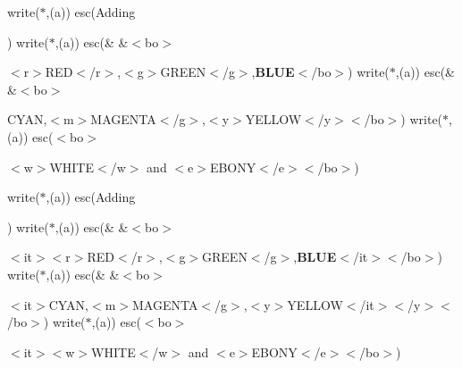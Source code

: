 write($\ast$,\textquotesingle{}(a)\textquotesingle{}) esc(\textquotesingle{}Adding 
\begin{DoxyItemize}
\item 
\end{DoxyItemize}\textquotesingle{}) write($\ast$,\textquotesingle{}(a)\textquotesingle{}) esc(\& \&\textquotesingle{}$<$bo$>$
\begin{DoxyItemize}
\item 
\end{DoxyItemize}$<$r$>$R\+ED$<$/r$>$,$<$g$>$G\+R\+E\+EN$<$/g$>$,{\bfseries B\+L\+UE}$<$/bo$>$\textquotesingle{}) write($\ast$,\textquotesingle{}(a)\textquotesingle{}) esc(\& \&\textquotesingle{}$<$bo$>$
\begin{DoxyItemize}
\item 
\end{DoxyItemize}{\ttfamily C\+Y\+AN},$<$m$>$M\+A\+G\+E\+N\+TA$<$/g$>$,$<$y$>$Y\+E\+L\+L\+OW$<$/y$>$$<$/bo$>$\textquotesingle{}) write($\ast$,\textquotesingle{}(a)\textquotesingle{}) esc(\textquotesingle{}$<$bo$>$
\begin{DoxyItemize}
\item 
\end{DoxyItemize}$<$w$>$W\+H\+I\+TE$<$/w$>$ and $<$e$>$E\+B\+O\+NY$<$/e$>$$<$/bo$>$\textquotesingle{})

write($\ast$,\textquotesingle{}(a)\textquotesingle{}) esc(\textquotesingle{}Adding 
\begin{DoxyItemize}
\item 
\end{DoxyItemize}\textquotesingle{}) write($\ast$,\textquotesingle{}(a)\textquotesingle{}) esc(\& \&\textquotesingle{}$<$bo$>$
\begin{DoxyItemize}
\item 
\end{DoxyItemize}$<$it$>$$<$r$>$R\+ED$<$/r$>$,$<$g$>$G\+R\+E\+EN$<$/g$>$,{\bfseries B\+L\+UE}$<$/it$>$$<$/bo$>$\textquotesingle{}) write($\ast$,\textquotesingle{}(a)\textquotesingle{}) esc(\& \&\textquotesingle{}$<$bo$>$
\begin{DoxyItemize}
\item 
\end{DoxyItemize}$<$it$>${\ttfamily C\+Y\+AN},$<$m$>$M\+A\+G\+E\+N\+TA$<$/g$>$,$<$y$>$Y\+E\+L\+L\+OW$<$/it$>$$<$/y$>$$<$/bo$>$\textquotesingle{}) write($\ast$,\textquotesingle{}(a)\textquotesingle{}) esc(\textquotesingle{}$<$bo$>$
\begin{DoxyItemize}
\item 
\end{DoxyItemize}$<$it$>$$<$w$>$W\+H\+I\+TE$<$/w$>$ and $<$e$>$E\+B\+O\+NY$<$/e$>$$<$/bo$>$\textquotesingle{})

